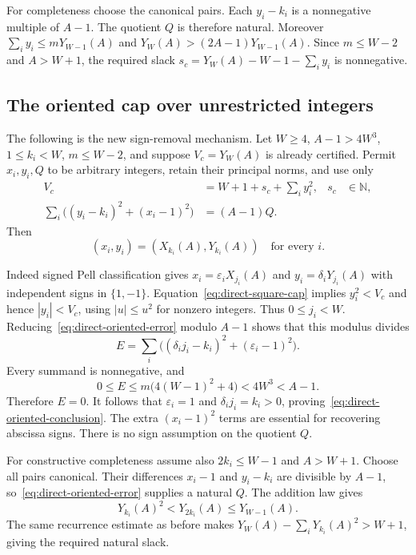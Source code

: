 For completeness choose the canonical pairs. Each $y_i-k_i$ is a
nonnegative multiple of $A-1$. The quotient $Q$ is therefore natural.
Moreover $\sum_i y_i\le mY_{W-1}(A)$ and
$Y_W(A)>(2A-1)Y_{W-1}(A)$. Since $m\le W-2$ and $A>W+1$, the
required slack $s_c=Y_W(A)-W-1-\sum_i y_i$ is nonnegative.

\subsection{The oriented cap over unrestricted integers}

The following is the new sign-removal mechanism. Let $W\ge4$,
$A-1>4W^3$, $1\le k_i<W$, $m\le W-2$, and suppose
$V_c=Y_W(A)$ is already certified. Permit $x_i,y_i,Q$ to be arbitrary
integers, retain their principal norms, and use only
\begin{align}
 V_c&=W+1+s_c+\sum_i y_i^2,&s_c&\in\mathbb N,
 \label{eq:direct-square-cap}\\
 \sum_i\bigl((y_i-k_i)^2+(x_i-1)^2\bigr)&=(A-1)Q.
 \label{eq:direct-oriented-error}
\end{align}
Then
\begin{equation}
 (x_i,y_i)=(X_{k_i}(A),Y_{k_i}(A))
 \quad\text{for every }i.
 \label{eq:direct-oriented-conclusion}
\end{equation}

Indeed signed Pell classification gives
$x_i=\varepsilon_iX_{j_i}(A)$ and
$y_i=\delta_iY_{j_i}(A)$ with independent signs in $\{1,-1\}$.
Equation~\eqref{eq:direct-square-cap} implies $y_i^2<V_c$ and hence
$|y_i|<V_c$, using $|u|\le u^2$ for nonzero integers.
Thus $0\le j_i<W$. Reducing~\eqref{eq:direct-oriented-error}
modulo $A-1$ shows that this modulus divides
\[
 E=\sum_i\bigl((\delta_i j_i-k_i)^2+(\varepsilon_i-1)^2\bigr).
\]
Every summand is nonnegative, and
\[
 0\le E\le m\bigl(4(W-1)^2+4\bigr)<4W^3<A-1.
\]
Therefore $E=0$. It follows that $\varepsilon_i=1$ and
$\delta_i j_i=k_i>0$, proving~\eqref{eq:direct-oriented-conclusion}.
The extra $(x_i-1)^2$ terms are essential for recovering abscissa signs.
There is no sign assumption on the quotient $Q$.

For constructive completeness assume also $2k_i\le W-1$ and $A>W+1$.
Choose all pairs canonical. Their differences $x_i-1$ and $y_i-k_i$
are divisible by $A-1$, so~\eqref{eq:direct-oriented-error} supplies
a natural $Q$. The addition law gives
\[
 Y_{k_i}(A)^2<Y_{2k_i}(A)\le Y_{W-1}(A).
\]
The same recurrence estimate as before makes
$Y_W(A)-\sum_iY_{k_i}(A)^2>W+1$, giving the required natural slack.

